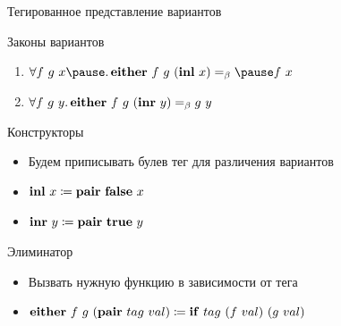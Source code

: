     \begin{frame}[fragile]{Тегированное представление вариантов}
        \begin{block}{Законы вариантов}
            \begin{enumerate}
                \item $\forall f~g~x \pause \ldotp \term{either} \ap f \ap g \ap (\term{inl} \ap x) \eqbeta \pause f \ap x$
                \item $\forall f~g~y \ldotp \mathbf{either} ~ f ~ g ~ (\mathbf{inr} ~ y) =_\beta g ~ y$
            \end{enumerate}
        \end{block}
        \pause
        \begin{block}{Конструкторы}
            \begin{itemize}
                \item Будем приписывать булев тег для различения вариантов
                \item $\mathbf{inl} ~ x \coloneqq \mathbf{pair} ~ \mathbf{false} ~ x$
                \item $\mathbf{inr} ~ y \coloneqq \mathbf{pair} ~ \mathbf{true} ~ y$
            \end{itemize}
        \end{block}
        \pause
        \begin{block}{Элиминатор}
            \begin{itemize}
                \item Вызвать нужную функцию в зависимости от тега
                \item $\mathbf{either} ~ f ~ g ~ (\mathbf{pair} ~ tag ~ val) \coloneqq \mathbf{if} ~ tag ~ (f ~ val) ~ (g ~ val)$
            \end{itemize}
        \end{block}
    \end{frame}

